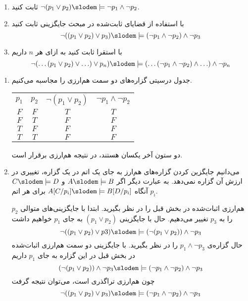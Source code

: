 \begin{enumerate}[label=(\alph*)]
  \item
  ثابت کنید
  $\neg(p_1\vee p_2)\slodem\models\neg p_1\wedge\neg p_2$.
  
  \item
  با استفاده از قضایای ثابت‌شده در مبحث جایگزینی ثابت کنید
  $$\neg((p_1\vee p_2)\vee p_3)\slodem\models (\neg p_1 \wedge \neg p_2)\wedge\neg p_3$$
  
  \item
  با استقرا ثابت کنید به ازای هر $n$ داریم
  $$\neg(\ldots(p_1\vee p_2)\vee \ldots)\vee p_n)\slodem\models (\ldots(\neg p_1\wedge \neg p_2)\wedge\ldots)\wedge\neg p_n$$
  \end{enumerate}\quad\vspace{-9mm}
  \begin{ans}
    \begin{enumerate}
      \item جدول درسیتی گزاره‌های دو سمت هم‌ارزی را مجاسبه می‌کنیم.
      \begin{LTR}
        \begin{tabular}{| c | c | c | c |}
          $p_1$ & $p_2$ & $\neg (p_1 \vee p_2)$ & $\neg p_1 \wedge \neg p_2$ \\
          $F$ & $F$ & $T$ & $T$ \\
          $F$ & $T$ & $F$ & $F$ \\
          $T$ & $F$ & $F$ & $F$ \\
          $T$ & $T$ & $F$ & $F$
        \end{tabular}
      \end{LTR}
      دو ستون آخر یکسان هستند، در نتیجه هم‌ارزی برقرار است.
  
      \item
      می‌دانیم جایگزین کردن گزاره‌های هم‌ارز به جای یک اتم در یک گزاره، تغییری در ارزش آن گزاره نمی‌دهد. به عبارت دیگر اگر
      $A \slodem\models B$ و
      $C \slodem\models D$
      آنگاه
      $A[C/p_i] \slodem\models B[D/p_i]$
      برای هر اتم $p_i$.
  
      هم‌ارزی اثبات‌شده در بخش قبل را در نظر بگیرید. ابتدا با جایگزینی‌های متوالی $p_2$ را به $p_3$ تغییر می‌دهیم.
      حال با جایگزینی
      $(p_1 \vee p_2)$
      به جای
      $p_1$
      خواهیم داشت
      $$ \neg ((p_1 \vee p_2) \vee p3) \slodem\models (\neg (p_1 \vee p_2)) \wedge \neg p_3 $$
      حال گزاره‌ی
      $p_1 \wedge \neg p_3$
      را در نظر بگیرید. با جایگزینی دو سمت هم‌ارزی اثبات‌شده در بخش قبل در این گزاره به جای
      $p_1$
      داریم
      $$ (\neg (p_1 \vee p_2)) \wedge \neg p_3 \slodem\models (\neg p_1 \wedge \neg p_2) \wedge \neg p_3 $$
      چون هم‌ارزی تراگذری است، می‌توان نتیجه گرفت
      $$ \neg((p_1\vee p_2)\vee p_3)\slodem\models (\neg p_1 \wedge \neg p_2)\wedge\neg p_3 $$
  

\end{enumerate}
\end{ans}
